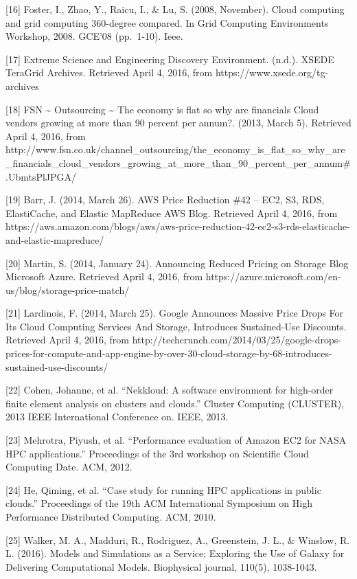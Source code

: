 \documentclass[]{article}
\begin{document}
{[}16{]} Foster, I., Zhao, Y., Raicu, I., \& Lu, S. (2008, November).
Cloud computing and grid computing 360-degree compared. In Grid
Computing Environments Workshop, 2008. GCE'08 (pp.~1-10). Ieee.

{[}17{]} Extreme Science and Engineering Discovery Environment. (n.d.).
XSEDE \textbar{} TeraGrid Archives. Retrieved April 4, 2016, from
https://www.xsede.org/tg-archives

{[}18{]} FSN \textasciitilde{} Outsourcing \textasciitilde{} The economy
is flat so why are financials Cloud vendors growing at more than 90
percent per annum?. (2013, March 5). Retrieved April 4, 2016, from
http://www.fsn.co.uk/channel\_outsourcing/the\_economy\_is\_flat\_so\_why\_are\_financials\_cloud\_vendors\_growing\_at\_more\_than\_90\_percent\_per\_annum\#.UbmtsPlJPGA/

{[}19{]} Barr, J. (2014, March 26). AWS Price Reduction \#42 -- EC2, S3,
RDS, ElastiCache, and Elastic MapReduce \textbar{} AWS Blog. Retrieved
April 4, 2016, from
https://aws.amazon.com/blogs/aws/aws-price-reduction-42-ec2-s3-rds-elasticache-and-elastic-mapreduce/

{[}20{]} Martin, S. (2014, January 24). Announcing Reduced Pricing on
Storage \textbar{} Blog \textbar{} Microsoft Azure. Retrieved April 4,
2016, from https://azure.microsoft.com/en-us/blog/storage-price-match/

{[}21{]} Lardinois, F. (2014, March 25). Google Announces Massive Price
Drops For Its Cloud Computing Services And Storage, Introduces
Sustained-Use Discounts. Retrieved April 4, 2016, from
http://techcrunch.com/2014/03/25/google-drops-prices-for-compute-and-app-engine-by-over-30-cloud-storage-by-68-introduces-sustained-use-discounts/

{[}22{]} Cohen, Johanne, et al. ``Nekkloud: A software environment for
high-order finite element analysis on clusters and clouds.'' Cluster
Computing (CLUSTER), 2013 IEEE International Conference on. IEEE, 2013.

{[}23{]} Mehrotra, Piyush, et al. ``Performance evaluation of Amazon EC2
for NASA HPC applications.'' Proceedings of the 3rd workshop on
Scientific Cloud Computing Date. ACM, 2012.

{[}24{]} He, Qiming, et al. ``Case study for running HPC applications in
public clouds.'' Proceedings of the 19th ACM International Symposium on
High Performance Distributed Computing. ACM, 2010.

{[}25{]} Walker, M. A., Madduri, R., Rodriguez, A., Greenstein, J. L.,
\& Winslow, R. L. (2016). Models and Simulations as a Service: Exploring
the Use of Galaxy for Delivering Computational Models. Biophysical
journal, 110(5), 1038-1043.
\end{document}
